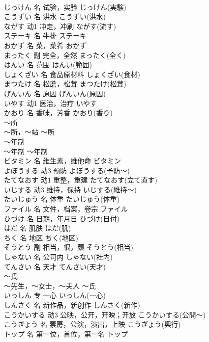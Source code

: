 \documentclass[8pt]{extreport}
\begin{document}
\begin{CJK}{UTF8}{min}
\\	じっけん	名	试验，实验	じっけん(実験)	
\\	こうずい	名	洪水	こうずい(洪水)	
\\	ながす	动1	冲走，冲刷	ながす(流す)	
\\	ステーキ	名	牛排	ステーキ	
\\	おかず	名	菜，菜肴	おかず	
\\	まったく	副	完全，全然	まったく(全く)	
\\	はんい	名	范围	はんい(範囲)	
\\	しょくざい	名	食品原材料	しょくざい(食材)	
\\	まつたけ	名	松蘑，松茸	まつたけ(松茸)	
\\	げんいん	名	原因	げんいん(原因)	
\\	いやす	动1	医治，治疗	いやす	
\\	かおり	名	香味，芳香	かおり(香り)	
\\	～所	
\\	～所，～站	～所	
\\	～年制	
\\	～年制	～年制	
\\	ビタミン	名	维生素，维他命	ビタミン	
\\	よぼうする	动3	预防	よぼうする(予防～)	
\\	たてなおす	动1	重整，重建	たてなおす(立て直す)	
\\	いじする	动3	维持，保持	いじする(維持～)	
\\	たいじゅう	名	体重	たいじゅう(体重)	
\\	ファイル	名	文件，档案，卷宗	ファイル	
\\	ひづけ	名	日期，年月日	ひづけ(日付)	
\\	はだ	名	肌肤	はだ(肌)	
\\	ちく	名	地区	ちく(地区)	
\\	そうとう	副	相当，很，颇	そうとう(相当)	
\\	しゃない	名	公司内	しゃない(社内)	
\\	てんさい	名	天才	てんさい(天才)	
\\	～氏	
\\	～先生，～女士，～夫人	～氏	
\\	いっしん	专	一心	いっしん(一心)	
\\	しんさく	名	新作品，新创作	しんさく(新作)	
\\	こうかいする	动3	公映，公开，开映；开放	こうかいする(公開～)	
\\	こうぎょう	名	票房，公演，演出，上映	こうぎょう(興行)	
\\	トップ	名	第一位，首位，第一名	トップ	

\end{CJK}
\end{document}
